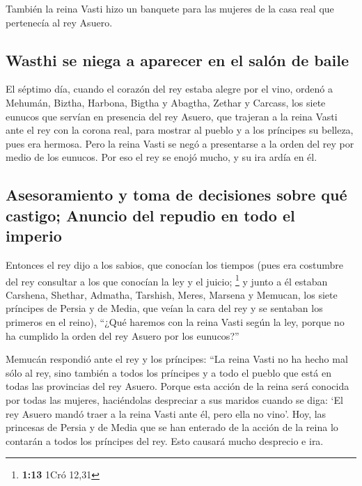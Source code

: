  También la reina Vasti hizo un banquete para las mujeres
de la casa real que pertenecía al rey Asuero.

\hypertarget{wasthi-se-niega-a-aparecer-en-el-saluxf3n-de-baile}{%
\subsection{Wasthi se niega a aparecer en el salón de
baile}\label{wasthi-se-niega-a-aparecer-en-el-saluxf3n-de-baile}}

 El séptimo día, cuando el corazón del rey estaba alegre
por el vino, ordenó a Mehumán, Biztha, Harbona, Bigtha y Abagtha, Zethar
y Carcass, los siete eunucos que servían en presencia del rey Asuero,
 que trajeran a la reina Vasti ante el rey con la corona
real, para mostrar al pueblo y a los príncipes su belleza, pues era
hermosa.  Pero la reina Vasti se negó a presentarse a la
orden del rey por medio de los eunucos. Por eso el rey se enojó mucho, y
su ira ardía en él.

\hypertarget{asesoramiento-y-toma-de-decisiones-sobre-quuxe9-castigo-anuncio-del-repudio-en-todo-el-imperio}{%
\subsection{Asesoramiento y toma de decisiones sobre qué castigo;
Anuncio del repudio en todo el
imperio}\label{asesoramiento-y-toma-de-decisiones-sobre-quuxe9-castigo-anuncio-del-repudio-en-todo-el-imperio}}

 Entonces el rey dijo a los sabios, que conocían los
tiempos (pues era costumbre del rey consultar a los que conocían la ley
y el juicio; \footnote{\textbf{1:13} 1Cró 12,31}  y junto
a él estaban Carshena, Shethar, Admatha, Tarshish, Meres, Marsena y
Memucan, los siete príncipes de Persia y de Media, que veían la cara del
rey y se sentaban los primeros en el reino),  ``¿Qué
haremos con la reina Vasti según la ley, porque no ha cumplido la orden
del rey Asuero por los eunucos?''

 Memucán respondió ante el rey y los príncipes: ``La
reina Vasti no ha hecho mal sólo al rey, sino también a todos los
príncipes y a todo el pueblo que está en todas las provincias del rey
Asuero.  Porque esta acción de la reina será conocida por
todas las mujeres, haciéndolas despreciar a sus maridos cuando se diga:
`El rey Asuero mandó traer a la reina Vasti ante él, pero ella no vino'.
 Hoy, las princesas de Persia y de Media que se han
enterado de la acción de la reina lo contarán a todos los príncipes del
rey. Esto causará mucho desprecio e ira.

